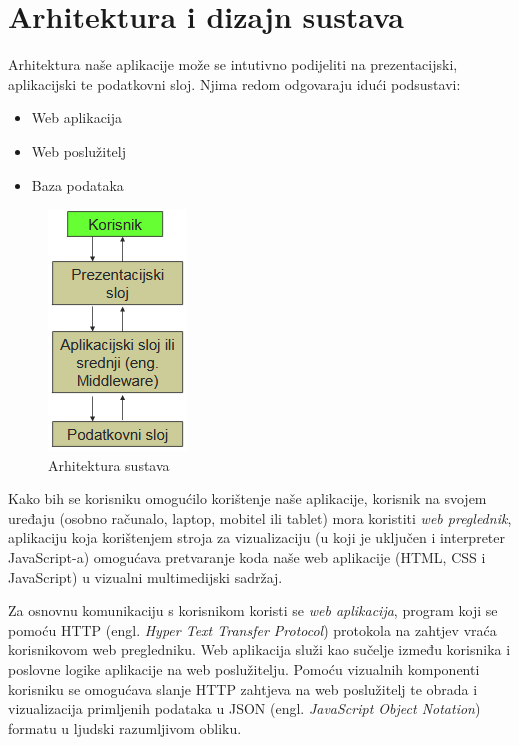 \chapter{Arhitektura i dizajn sustava}

Arhitektura naše aplikacije može se intutivno podijeliti na prezentacijski, aplikacijski te podatkovni sloj. Njima redom odgovaraju idući podsustavi:
\begin{itemize}
	\item 	Web aplikacija
	\item 	Web poslužitelj
	\item 	Baza podataka
\end{itemize}

\begin{figure}[H]
	\includegraphics[scale=0.6]{slike/ArhitekturniPodsustavi.PNG}
	\centering
	\caption{Arhitektura sustava}
	\label{fig:arhitekturni_podsustavi}
\end{figure}

Kako bih se korisniku omogućilo korištenje naše aplikacije, korisnik na svojem uređaju (osobno računalo, laptop, mobitel ili tablet) mora koristiti \textit{web preglednik}, aplikaciju koja korištenjem stroja za vizualizaciju (u koji je uključen i interpreter JavaScript-a) omogućava
pretvaranje koda naše web aplikacije (HTML, CSS i JavaScript) u vizualni multimedijski sadržaj.

Za osnovnu komunikaciju s korisnikom koristi se \textit{web aplikacija}, program koji se pomoću HTTP (engl. \textit{Hyper Text Transfer Protocol}) protokola na zahtjev vraća korisnikovom web pregledniku. Web aplikacija služi kao sučelje između korisnika i poslovne logike aplikacije
na web poslužitelju. Pomoću vizualnih komponenti korisniku se omogućava slanje HTTP zahtjeva na web poslužitelj te obrada i vizualizacija primljenih podataka u JSON (engl. \textit{JavaScript Object Notation}) formatu u ljudski razumljivom obliku.

